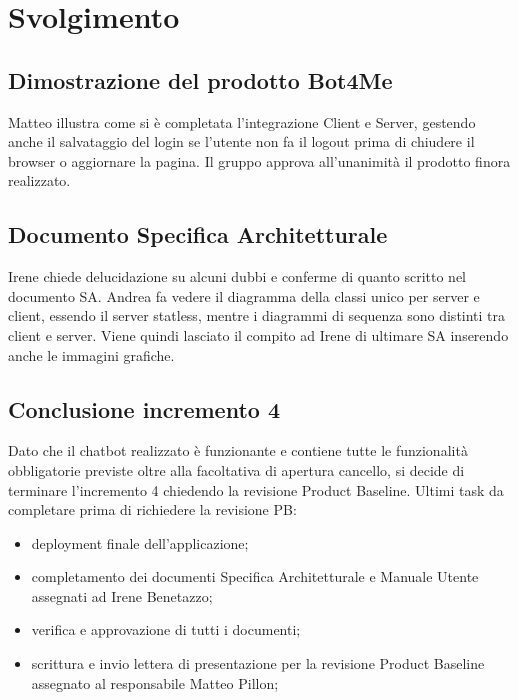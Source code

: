 \section{Svolgimento}
\subsection{Dimostrazione del prodotto Bot4Me}
Matteo illustra come si è completata l'integrazione Client e Server, gestendo anche il salvataggio del login se l'utente non fa il logout prima di chiudere il browser o aggiornare la pagina. \newline
Il gruppo approva all'unanimità il prodotto finora realizzato.
\subsection{Documento Specifica Architetturale}
Irene chiede delucidazione su alcuni dubbi e conferme di quanto scritto nel documento SA. \newline
Andrea fa vedere il diagramma  della classi unico per server e client, essendo il server statless, mentre i diagrammi di sequenza sono distinti tra client e server.
Viene quindi lasciato il compito ad Irene di ultimare SA inserendo anche le immagini grafiche.
\subsection{Conclusione incremento 4}
Dato che il chatbot realizzato è funzionante e contiene tutte le funzionalità obbligatorie previste oltre alla facoltativa di apertura cancello, si decide di terminare l'incremento 4 chiedendo la revisione Product Baseline. \newline
Ultimi task da completare prima di richiedere la revisione PB:
\begin{itemize}
    \item deployment finale dell'applicazione;
    \item completamento dei documenti Specifica Architetturale e Manuale Utente assegnati ad Irene Benetazzo;
    \item verifica e approvazione di tutti i documenti;
    \item scrittura e invio lettera di presentazione per la revisione Product Baseline assegnato al responsabile Matteo Pillon;
\end{itemize} 
